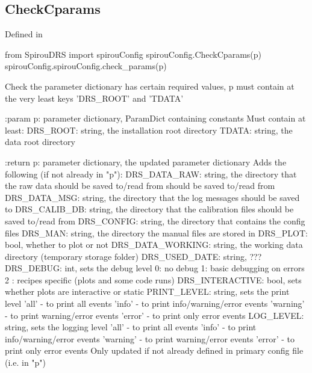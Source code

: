 \noindent\begin{minipage}{\textwidth}
\subsection{CheckCparams}

Defined in \spirouConfig{}

\begin{pythonbox}
from SpirouDRS import spirouConfig
spirouConfig.CheckCparams(p)
spirouConfig.spirouConfig.check_params(p)
\end{pythonbox}

\begin{pythondocstring}
Check the parameter dictionary has certain required values, p must contain
at the very least keys 'DRS_ROOT' and 'TDATA'

:param p: parameter dictionary, ParamDict containing constants
    Must contain at least:
        DRS_ROOT: string, the installation root directory
        TDATA: string, the data root directory

:return p: parameter dictionary, the updated parameter dictionary
        Adds the following (if not already in "p"):
            DRS_DATA_RAW: string, the directory that the raw data should
                          be saved to/read from
                            should be saved to/read from
            DRS_DATA_MSG: string, the directory that the log messages
                          should be saved to
            DRS_CALIB_DB: string, the directory that the calibration
                          files should be saved to/read from
            DRS_CONFIG: string, the directory that contains the config files
            DRS_MAN: string, the directory the manual files are stored in
            DRS_PLOT: bool, whether to plot or not
            DRS_DATA_WORKING: string, the working data directory (temporary
                              storage folder)
            DRS_USED_DATE: string, ???
            DRS_DEBUG: int, sets the debug level
                            0: no debug
                            1: basic debugging on errors
                            2 : recipes specific (plots and some code runs)
            DRS_INTERACTIVE: bool, sets whether plots are interactive or
                             static
            PRINT_LEVEL: string, sets the print level
                               'all' - to print all events
                               'info' - to print info/warning/error events
                               'warning' - to print warning/error events
                               'error' - to print only error events
            LOG_LEVEL: string, sets the logging level
                               'all' - to print all events
                               'info' - to print info/warning/error events
                               'warning' - to print warning/error events
                               'error' - to print only error events
    Only updated if not already defined in primary config file
    (i.e. in "p")
\end{pythondocstring}
\end{minipage}

